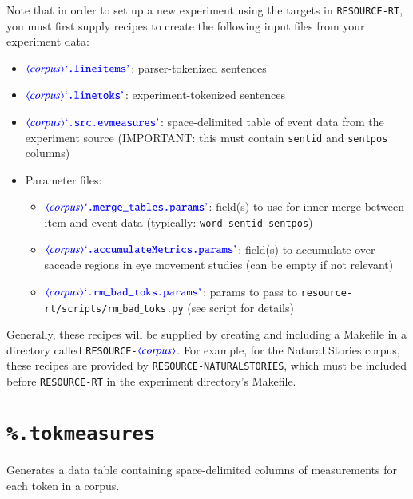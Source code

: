 \documentclass[12pt]{report}
\def\blue{\color{blue}}
\begin{document}
Note that in order to set up a new experiment using the targets in {\tt RESOURCE-RT}, you must first supply recipes to create the following input files from your experiment data:

\begin{itemize}
\item {\tt\blue $\dtype{corpus} \dcode{.lineitems}$}: parser-tokenized sentences
\item {\tt\blue $\dtype{corpus} \dcode{.linetoks}$}: experiment-tokenized sentences
\item {\tt\blue $\dtype{corpus} \dcode{.src.evmeasures}$}: space-delimited table of event data from the experiment source (IMPORTANT: this must contain {\tt\blue sentid} and {\tt\blue sentpos} columns)
\item Parameter files:
\begin{itemize}
\item {\tt\blue $\dtype{corpus} \dcode{.merge\_tables.params}$}: field(s) to use for inner merge between item and event data (typically: {\tt\blue word sentid sentpos})
\item {\tt\blue $\dtype{corpus} \dcode{.accumulateMetrics.params}$}: field(s) to accumulate over saccade regions in eye movement studies (can be empty if not relevant) 
\item {\tt\blue $\dtype{corpus} \dcode{.rm\_bad\_toks.params}$}: params to pass to {\tt\blue resource-rt/scripts/rm$\_$bad$\_$toks.py} (see script for details) 
\end{itemize}
\end{itemize}

Generally, these recipes will be supplied by creating and including a Makefile in a directory called {\tt RESOURCE-$\dtype{corpus}$}.
For example, for the Natural Stories corpus, these recipes are provided by {\tt RESOURCE-NATURALSTORIES}, which must be included before {\tt RESOURCE-RT} in the experiment directory's Makefile.

\section{{\blue\tt \%.tokmeasures}}

Generates a data table containing space-delimited columns of measurements for each token in a corpus.
\end{document}
